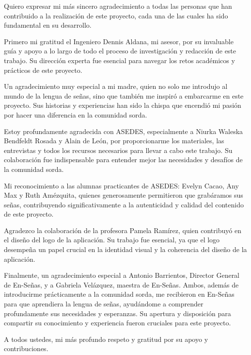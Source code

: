Quiero expresar mi más sincero agradecimiento a todas las personas que han contribuido a la realización de este proyecto, cada una de las cuales ha sido fundamental en su desarrollo.

Primero mi gratitud el Ingeniero Dennis Aldana, mi asesor, por su invaluable guía y apoyo a lo largo de todo el proceso de investigación y redacción de este trabajo. Su dirección experta fue esencial para navegar los retos académicos y prácticos de este proyecto.

Un agradecimiento muy especial a mi madre, quien no solo me introdujo al mundo de la lengua de señas, sino que también me inspiró a embarcarme en este proyecto. Sus historias y experiencias han sido la chispa que encendió mi pasión por hacer una diferencia en la comunidad sorda.

Estoy profundamente agradecida con ASEDES, especialmente a Niurka Waleska Bendfeldt Rosada y Alain de León, por proporcionarme los materiales, las entrevistas y todos los recursos necesarios para llevar a cabo este trabajo. Su colaboración fue indispensable para entender mejor las necesidades y desafíos de la comunidad sorda.

Mi reconocimiento a las alumnas practicantes de ASEDES: Evelyn Cacao, Any Max y Ruth Amézquita, quienes generosamente permitieron que grabáramos sus señas, contribuyendo significativamente a la autenticidad y calidad del contenido de este proyecto.

Agradezco  la colaboración de la profesora Pamela Ramírez, quien contribuyó en el diseño del logo de la aplicación. Su trabajo fue esencial, ya que el logo desempeña un papel crucial en la identidad visual y la coherencia del diseño de la aplicación.

Finalmente, un agradecimiento especial a Antonio Barrientos, Director General de En-Señas, y a Gabriela Velázquez, maestra de En-Señas. Ambos, además de introducirme prácticamente a la comunidad sorda, me recibieron en En-Señas para que aprendiera la lengua de señas, ayudándome a comprender profundamente sus necesidades y esperanzas. Su apertura y disposición para compartir su conocimiento y experiencia fueron cruciales para este proyecto.

A todos ustedes, mi más profundo respeto y gratitud por su apoyo y contribuciones.